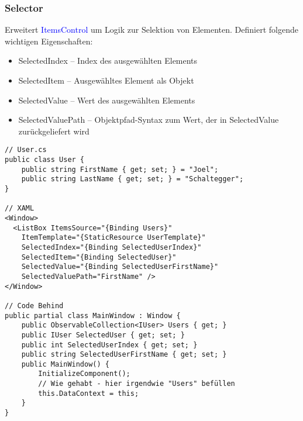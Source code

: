 \subsubsection{Selector}
Erweitert \textcolor{blue}{ItemsControl} um Logik zur Selektion von Elementen. Definiert folgende wichtigen Eigenschaften:
\begin{itemize}[topsep=0pt, leftmargin=4mm]
    \setlength\itemsep{-0.3em}
    \item SelectedIndex – Index des ausgewählten Elements
    \item SelectedItem – Ausgewähltes Element als Objekt
    \item SelectedValue – Wert des ausgewählten Elements
    \item SelectedValuePath – Objektpfad-Syntax zum Wert, der in SelectedValue zurückgeliefert wird
\end{itemize}
\begin{lstlisting}
// User.cs
public class User {
    public string FirstName { get; set; } = "Joel";
    public string LastName { get; set; } = "Schaltegger";
}

// XAML
<Window>
  <ListBox ItemsSource="{Binding Users}"
    ItemTemplate="{StaticResource UserTemplate}"
    SelectedIndex="{Binding SelectedUserIndex}"
    SelectedItem="{Binding SelectedUser}"
    SelectedValue="{Binding SelectedUserFirstName}"
    SelectedValuePath="FirstName" />
</Window>

// Code Behind
public partial class MainWindow : Window {
    public ObservableCollection<IUser> Users { get; }
    public IUser SelectedUser { get; set; }
    public int SelectedUserIndex { get; set; }
    public string SelectedUserFirstName { get; set; }
    public MainWindow() {
        InitializeComponent();
        // Wie gehabt - hier irgendwie "Users" befüllen
        this.DataContext = this;
    }
}
\end{lstlisting}